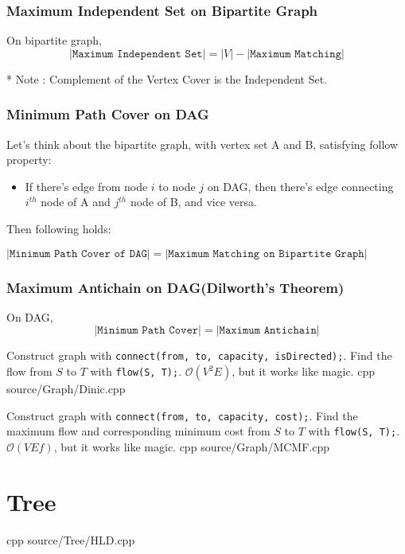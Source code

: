 \documentclass[landscape, 8pt, a4paper, oneside]{extarticle}
\begin{document}
\begin{multicols}{3}
\subsubsection{Maximum Independent Set on Bipartite Graph}
On bipartite graph, $$|\texttt{Maximum Independent Set}|=|V|-|\texttt{Maximum Matching}|$$

* Note : Complement of the Vertex Cover is the Independent Set.

\subsubsection{Minimum Path Cover on DAG}
Let's think about the bipartite graph, with vertex set A and B, satisfying follow property:

\begin{itemize}
    \item If there's edge from node $i$ to node $j$ on DAG, then there's edge connecting $i^{th}$ node of A and $j^{th}$ node of B, and vice versa.
\end{itemize}

Then following holds:

$|\texttt{Minimum Path Cover of DAG}| = |\texttt{Maximum Matching on Bipartite Graph}|$ 


\subsubsection{Maximum Antichain on DAG(Dilworth's Theorem)}
On DAG, $$|\texttt{Minimum Path Cover}| = |\texttt{Maximum Antichain}|$$


{Construct graph with \texttt{connect(from, to, capacity, isDirected);}. Find the flow from $S$ to $T$ with \texttt{flow(S, T);}. }
{$\mathcal O(V^2E)$, but it works like magic.}
{cpp}
{source/Graph/Dinic.cpp}

{Construct graph with \texttt{connect(from, to, capacity, cost);}. Find the maximum flow and corresponding minimum cost from $S$ to $T$ with \texttt{flow(S, T);}.}
{$\mathcal O(VEf)$, but it works like magic.}
{cpp}
{source/Graph/MCMF.cpp}

\section{Tree}

{}
{}
{cpp}
{source/Tree/HLD.cpp}


\end{multicols}
\end{document}
